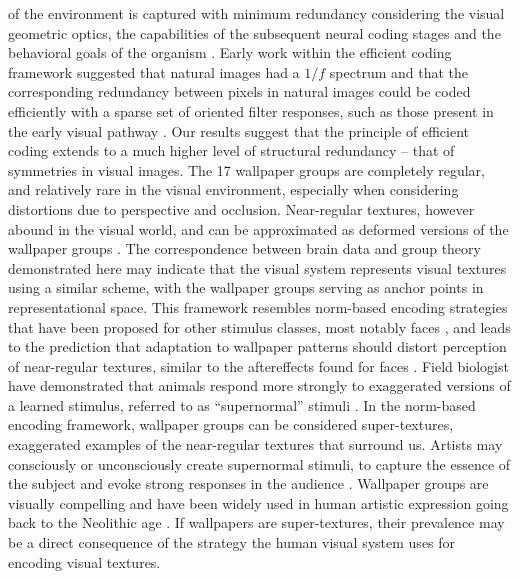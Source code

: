 \documentclass[9pt,twocolumn,twoside,lineno]{pnas-new}
\begin{document}
of the environment is captured with minimum redundancy considering the visual geometric optics, the capabilities of the subsequent neural coding stages and the behavioral goals of the organism \cite{RN1758, RN1760, RN1757, RN1756}. Early work within the efficient coding framework suggested that natural images had a $1/f$ spectrum and that the corresponding redundancy between pixels in natural images could be coded efficiently with a sparse set of oriented filter responses, such as those present in the early visual pathway \cite{RN1740, RN1446}. Our results suggest that the principle of efficient coding extends to a much higher level of structural redundancy – that of symmetries in visual images. The 17 wallpaper groups are completely regular, and relatively rare in the visual environment, especially when considering distortions due to perspective and occlusion. Near-regular textures, however abound in the visual world, and can be approximated as deformed versions of the wallpaper groups \cite{RN1519}. The correspondence between brain data and group theory demonstrated here may indicate that the visual system represents visual textures using a similar scheme, with the wallpaper groups serving as anchor points in representational space. This framework resembles norm-based encoding strategies that have been proposed for other stimulus classes, most notably faces \cite{RN435}, and leads to the prediction that adaptation to wallpaper patterns should distort perception of near-regular textures, similar to the aftereffects found for faces \cite{RN1768}. Field biologist have demonstrated that animals respond more strongly to exaggerated versions of a learned stimulus, referred to as “supernormal” stimuli \cite{RN1775}. In the norm-based encoding framework, wallpaper groups can be considered super-textures, exaggerated examples of the near-regular textures that surround us. Artists may consciously or unconsciously create supernormal stimuli, to capture the essence of the subject and evoke strong responses in the audience \cite{RN1764}. Wallpaper groups are visually compelling and have been widely used in human artistic expression going back to the Neolithic age \cite{RN1949}. If wallpapers are super-textures, their prevalence may be a direct consequence of the strategy the human visual system uses for encoding visual textures. 





\end{document}
